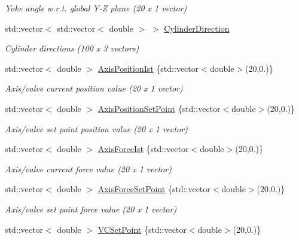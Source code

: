 \begin{DoxyCompactItemize}
\begin{DoxyCompactList}\small\item\em Yoke angle w.\+r.\+t. global Y-\/Z plane (20 x 1 vector) \end{DoxyCompactList}\item 
std\+::vector$<$ std\+::vector$<$ double $>$ $>$ \hyperlink{classlusetstatenamespace_1_1LusetState_a1b0b2630a42f90e950042e13dfd43684}{Cylinder\+Direction}
\begin{DoxyCompactList}\small\item\em Cylinder directions (100 x 3 vectors) \end{DoxyCompactList}\item 
std\+::vector$<$ double $>$ \hyperlink{classlusetstatenamespace_1_1LusetState_a08916e5165dd24321d7fa25b8f57e34b}{Axis\+Position\+Ist} \{std\+::vector$<$double$>$(20,0.)\}
\begin{DoxyCompactList}\small\item\em Axis/valve current position value (20 x 1 vector) \end{DoxyCompactList}\item 
std\+::vector$<$ double $>$ \hyperlink{classlusetstatenamespace_1_1LusetState_a56c2fd580cf37edb27331fd0f2c2c568}{Axis\+Position\+Set\+Point} \{std\+::vector$<$double$>$(20,0.)\}
\begin{DoxyCompactList}\small\item\em Axis/valve set point position value (20 x 1 vector) \end{DoxyCompactList}\item 
std\+::vector$<$ double $>$ \hyperlink{classlusetstatenamespace_1_1LusetState_a1871b78843b041cfd08bfb169b1cea96}{Axis\+Force\+Ist} \{std\+::vector$<$double$>$(20,0.)\}
\begin{DoxyCompactList}\small\item\em Axis/valve current force value (20 x 1 vector) \end{DoxyCompactList}\item 
std\+::vector$<$ double $>$ \hyperlink{classlusetstatenamespace_1_1LusetState_a75356fce66c36244a1483860a2fd539e}{Axis\+Force\+Set\+Point} \{std\+::vector$<$double$>$(20,0.)\}
\begin{DoxyCompactList}\small\item\em Axis/valve set point force value (20 x 1 vector) \end{DoxyCompactList}\item 
std\+::vector$<$ double $>$ \hyperlink{classlusetstatenamespace_1_1LusetState_a8e499f28768eb59644ac6a000d6b9422}{V\+C\+Set\+Point} \{std\+::vector$<$double$>$(20,0.)\}

\end{DoxyCompactItemize}
